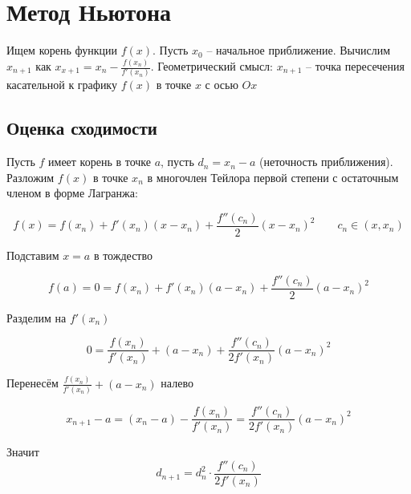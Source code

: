 \section{Метод Ньютона}


Ищем корень функции $f(x)$. Пусть $x_0$ -- начальное приближение.
Вычислим $x_{n + 1}$ как $x_{x + 1} = x_n - \frac{f(x_n)}{f'(x_n)}$.
Геометрический смысл: $x_{n + 1}$ -- точка пересечения касательной к графику $f(x)$ в точке $x$ с осью $Ox$

\quad

\subsection{Оценка сходимости}

Пусть $f$ имеет корень в точке $a$, пусть $d_n = x_n - a$ (неточность приближения).
Разложим $f(x)$ в точке $x_n$ в многочлен Тейлора первой степени с остаточным членом в форме Лагранжа:

\begin{equation}
    f(x) = f(x_n) + f'(x_n) \left(x - x_n\right) + \frac{f''(c_n)}{2} (x - x_n)^2 \qquad c_n \in (x, x_n) \label{taylor1}
\end{equation}

Подставим $x = a$ в тождество %

\begin{equation}
    f(a) = 0 = f(x_n) + f'(x_n) (a - x_n) + \frac{f''(c_n)}{2} (a - x_n)^2
\end{equation}

Разделим на $f'(x_n)$

\begin{equation}
    0 = \frac{f(x_n)}{f'(x_n)} + (a - x_n) + \frac{f''(c_n)}{2f'(x_n)} (a - x_n)^2
\end{equation}

Перенесём $ \frac{f(x_n)}{f'(x_n)} + (a - x_n)$ налево

\begin{equation}
    x_{n + 1} - a = (x_n - a) - \frac{f(x_n)}{f'(x_n)} = \frac{f''(c_n)}{2f'(x_n)} (a - x_n)^2
\end{equation}

Значит
\begin{equation}
    d_{n + 1} = d^2_n \cdot \frac{f''(c_n)}{2f'(x_n)} \label{nwt_error}
\end{equation}


